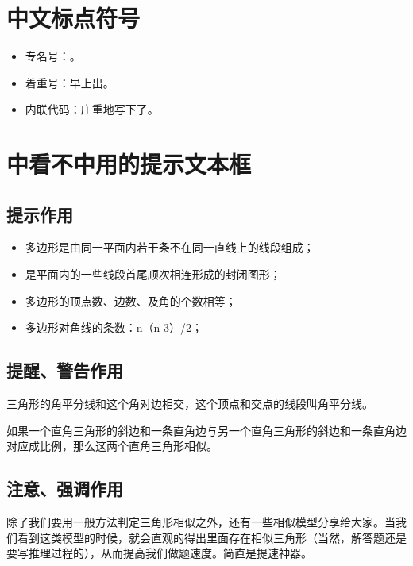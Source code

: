 \documentclass[12pt,A4paper,oneside]{ctexbook}
\begin{document}
\section{中文标点符号}

\begin{itemize}
\item{专名号：。}
\item{着重号：早上出。}
\item{内联代码：庄重地写下了。}
\end{itemize}

\section{中看不中用的提示文本框}

\subsection{提示作用}
\begin{提示}
    \begin{itemize}
    \item{多边形是由同一平面内若干条不在同一直线上的线段组成；}
    \item{是平面内的一些线段首尾顺次相连形成的封闭图形；}
    \item{多边形的顶点数、边数、及角的个数相等；}
    \item{多边形对角线的条数：n（n-3）/2；}
    \end{itemize}
\end{提示}

\subsection{提醒、警告作用}
\begin{提醒}
    三角形的角平分线和这个角对边相交，这个顶点和交点的线段叫角平分线。

    如果一个直角三角形的斜边和一条直角边与另一个直角三角形的斜边和一条直角边对应成比例，那么这两个直角三角形相似。
\end{提醒}

\subsection{注意、强调作用}
\begin{注意}
除了我们要用一般方法判定三角形相似之外，还有一些相似模型分享给大家。当我们看到这类模型的时候，就会直观的得出里面存在相似三角形（当然，解答题还是要写推理过程的），从而提高我们做题速度。简直是提速神器。
\end{注意}
\end{document}
